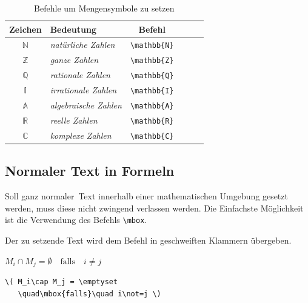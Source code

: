 \documentclass[a4paper,10pt,twoside]{scrbook}
\begin{document}
{\begin{table}[h!tb]
\centering
\caption{Befehle um Mengensymbole zu setzen}
\label{Tabelle_Mengensymbole}       %
\begin{tabular}{clclcl}
\hline
Zeichen & Bedeutung & Befehl  \\
\hline
\(\mathbb{N}\) & \textsl{natürliche Zahlen}    & \texttt{\textbackslash mathbb\{N\}} \\
\(\mathbb{Z}\) & \textsl{ganze Zahlen}         & \texttt{\textbackslash mathbb\{Z\}} \\
\(\mathbb{Q}\) & \textsl{rationale Zahlen}     & \texttt{\textbackslash mathbb\{Q\}} \\
\(\mathbb{I}\) & \textsl{irrationale Zahlen}   & \texttt{\textbackslash mathbb\{I\}} \\
\(\mathbb{A}\) & \textsl{algebraische Zahlen}  & \texttt{\textbackslash mathbb\{A\}} \\
\(\mathbb{R}\) & \textsl{reelle Zahlen}        & \texttt{\textbackslash mathbb\{R\}} \\
\(\mathbb{C}\) & \textsl{komplexe Zahlen}      & \texttt{\textbackslash mathbb\{C\}} \\
\hline
\end{tabular}
\end{table}

\subsection{Normaler Text in Formeln}

Soll ganz \glqq normaler\grqq\ Text innerhalb einer
mathematischen Umgebung gesetzt werden, muss diese nicht zwingend verlassen werden.
Die Einfachste Möglichkeit ist die Verwendung des Befehls \verb!\mbox!.


Der zu setzende Text wird dem Befehl in geschweiften 
Klammern übergeben. 


\begin{minipage}[c]{.38\textwidth}
\setlength{\parskip}{1em}
\centering
\( M_i\cap M_j = \emptyset
   \quad\mbox{falls}\quad i\not=j \)
\end{minipage}
\hfill
\begin{minipage}[c]{.6\textwidth}
\setlength{\parskip}{1em}
\begin{lstlisting}[label=mboxbeispiel, style=customlatex]
\( M_i\cap M_j = \emptyset
   \quad\mbox{falls}\quad i\not=j \)
\end{lstlisting}
\end{minipage}



}
\end{document}
